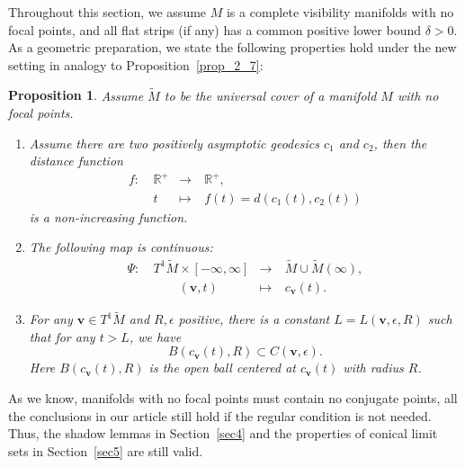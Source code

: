 \documentclass[reqno,11pt]{article}
\newtheorem{proposition}[theorem]{Proposition}
\theoremstyle{definition}
\theoremstyle{remark}
\numberwithin{equation}{section}
\begin{document}
Throughout this section, we assume $M$ is a complete visibility manifolds with no focal points, and all flat strips (if any) has a common positive lower bound $\delta>0$. As a geometric preparation, we state the following properties hold under the new setting in analogy to Proposition~\ref{prop_2_7}:

\begin{proposition}\label{prop_7_1}
	Assume $\widetilde{M}$ to be the universal cover of a manifold $M$ with no focal points.
	\begin{enumerate}
		\item\cite{OS1} Assume there are two positively asymptotic geodesics $c_1$ and $c_2$, then the distance function
		\begin{displaymath}
			\begin{aligned}
				f:~& \mathbb{R}^{+} & \to     &~\mathbb{R}^+,         \\
				    & t              & \mapsto &~f(t)=d(c_1(t),c_2(t))
			\end{aligned}
		\end{displaymath}
		is a non-increasing function.
		\item\cite{LWW} The following map is continuous:
		\begin{displaymath}
			\begin{aligned}
				\Psi:~& T^1\widetilde{M}\times[-\infty,\infty] & \to     &~\widetilde{M}\cup\widetilde{M}(\infty), \\
				       & \qquad(\bm{v},t)                       & \mapsto &~c_{\bm{v}}(t).
			\end{aligned}
		\end{displaymath}
		\item\cite{LWW} For any $\bm{v}\in T^1\widetilde{M}$ and $R,\epsilon$ positive, there is a constant $L=L(\bm{v},\epsilon,R)$ such that for any $t>L$, we have
		\begin{displaymath}
			B(c_{\bm{v}}(t),R)\subset C(\bm{v},\epsilon).
		\end{displaymath}
		Here $B(c_{\bm{v}}(t),R)$ is the open ball centered at $c_{\bm{v}}(t)$ with radius $R$.
	\end{enumerate}
\end{proposition}

As we know, manifolds with no focal points must contain no conjugate points, all the conclusions in our article still hold if the regular condition is not needed. Thus, the shadow lemmas in Section~\ref{sec4} and the properties of conical limit sets in Section~\ref{sec5} are still valid. 
\end{document}
